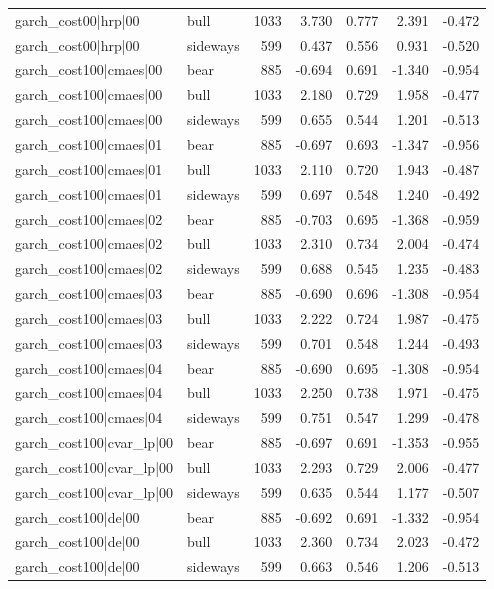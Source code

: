 \begin{table}
\begin{tabular}{llrrrrr}
garch\_cost00|hrp|00 & bull & 1033 & 3.730 & 0.777 & 2.391 & -0.472 \\
garch\_cost00|hrp|00 & sideways & 599 & 0.437 & 0.556 & 0.931 & -0.520 \\
garch\_cost100|cmaes|00 & bear & 885 & -0.694 & 0.691 & -1.340 & -0.954 \\
garch\_cost100|cmaes|00 & bull & 1033 & 2.180 & 0.729 & 1.958 & -0.477 \\
garch\_cost100|cmaes|00 & sideways & 599 & 0.655 & 0.544 & 1.201 & -0.513 \\
garch\_cost100|cmaes|01 & bear & 885 & -0.697 & 0.693 & -1.347 & -0.956 \\
garch\_cost100|cmaes|01 & bull & 1033 & 2.110 & 0.720 & 1.943 & -0.487 \\
garch\_cost100|cmaes|01 & sideways & 599 & 0.697 & 0.548 & 1.240 & -0.492 \\
garch\_cost100|cmaes|02 & bear & 885 & -0.703 & 0.695 & -1.368 & -0.959 \\
garch\_cost100|cmaes|02 & bull & 1033 & 2.310 & 0.734 & 2.004 & -0.474 \\
garch\_cost100|cmaes|02 & sideways & 599 & 0.688 & 0.545 & 1.235 & -0.483 \\
garch\_cost100|cmaes|03 & bear & 885 & -0.690 & 0.696 & -1.308 & -0.954 \\
garch\_cost100|cmaes|03 & bull & 1033 & 2.222 & 0.724 & 1.987 & -0.475 \\
garch\_cost100|cmaes|03 & sideways & 599 & 0.701 & 0.548 & 1.244 & -0.493 \\
garch\_cost100|cmaes|04 & bear & 885 & -0.690 & 0.695 & -1.308 & -0.954 \\
garch\_cost100|cmaes|04 & bull & 1033 & 2.250 & 0.738 & 1.971 & -0.475 \\
garch\_cost100|cmaes|04 & sideways & 599 & 0.751 & 0.547 & 1.299 & -0.478 \\
garch\_cost100|cvar\_lp|00 & bear & 885 & -0.697 & 0.691 & -1.353 & -0.955 \\
garch\_cost100|cvar\_lp|00 & bull & 1033 & 2.293 & 0.729 & 2.006 & -0.477 \\
garch\_cost100|cvar\_lp|00 & sideways & 599 & 0.635 & 0.544 & 1.177 & -0.507 \\
garch\_cost100|de|00 & bear & 885 & -0.692 & 0.691 & -1.332 & -0.954 \\
garch\_cost100|de|00 & bull & 1033 & 2.360 & 0.734 & 2.023 & -0.472 \\
garch\_cost100|de|00 & sideways & 599 & 0.663 & 0.546 & 1.206 & -0.513 \\

\end{tabular}
\end{table}
